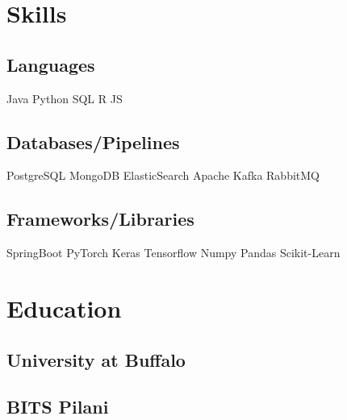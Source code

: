 \documentclass[]{plushcv}
\begin{document}
\hfill
\begin{minipage}[t]{0.25\textwidth} 


\section{Skills}
\subsection{Languages}
\sectionsep
Java \textbullet{} Python \textbullet{} SQL \textbullet{} R \textbullet{} JS\\
\sectionsep
\sectionsep

\subsection{Databases/Pipelines}
\sectionsep
PostgreSQL \textbullet{} MongoDB \textbullet{} ElasticSearch \textbullet{} Apache Kafka \textbullet{} RabbitMQ \\
\sectionsep
\sectionsep

\subsection{Frameworks/Libraries}
\sectionsep
SpringBoot \textbullet{} PyTorch \textbullet{} Keras \textbullet{} Tensorflow \textbullet{} Numpy \textbullet{} Pandas \textbullet{} Scikit-Learn\\
\sectionsep



\section{Education} 

\subsection{University at Buffalo}
\sectionsep

\subsection{BITS Pilani}
\sectionsep



\end{minipage}
\end{document}

